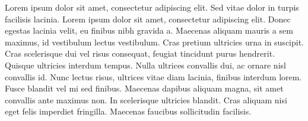 \documentclass[12pt]{amsart}
\theoremstyle{definition}
\theoremstyle{remark}
\begin{document}
Lorem ipsum dolor sit amet, consectetur adipiscing elit. Sed vitae dolor in turpis facilisis lacinia. Lorem ipsum dolor sit amet, consectetur adipiscing elit. Donec egestas lacinia velit, eu finibus nibh gravida a. Maecenas aliquam mauris a sem maximus, id vestibulum lectus vestibulum. Cras pretium ultricies urna in suscipit. Cras scelerisque dui vel risus consequat, feugiat tincidunt purus hendrerit. Quisque ultricies interdum tempus. Nulla ultrices convallis dui, ac ornare nisl convallis id. Nunc lectus risus, ultrices vitae diam lacinia, finibus interdum lorem. Fusce blandit vel mi sed finibus. Maecenas dapibus aliquam magna, sit amet convallis ante maximus non. In scelerisque ultricies blandit. Cras aliquam nisi eget felis imperdiet fringilla. Maecenas faucibus sollicitudin facilisis. 



\end{document}
